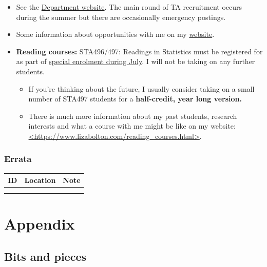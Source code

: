 \documentclass[
]{book}
\begin{document}
\begin{itemize}
\item
  See the \href{https://www.statistics.utoronto.ca/employment-opportunities/cupe-positions-unit-1}{Department website}. The main round of TA recruitment occurs during the summer but there are occasionally emergency postings.
\item
  Some information about opportunities with me on my \href{https://www.lizabolton.com/opportunities.html}{website}.
\item
  \textbf{Reading courses:} STA496/497: Readings in Statistics must be registered for as part of \href{https://utoronto.sharepoint.com/sites/ArtSci-STA/Undergrad/SitePages/Special-Enrolment-Courses--STA490Y1,-STA492H1-and-STA496H1-STA497H1.aspx}{special enrolment during July}. I will not be taking on any further students.

  \begin{itemize}
  \item
    If you're thinking about the future, I usually consider taking on a small number of STA497 students for a \textbf{half-credit, year long version.}
  \item
    There is much more information about my past students, research interests and what a course with me might be like on my website: \href{https://www.lizabolton.com/reading_courses.html}{\textless https://www.lizabolton.com/reading\_courses.html\textgreater{}}.
  \end{itemize}
\end{itemize}

\hypertarget{errata}{%
\section{Errata}\label{errata}}

\begin{longtable}[]{@{}lll@{}}
\toprule
ID & Location & Note \\
\midrule
\endhead
& & \\
& & \\
\bottomrule
\end{longtable}

\hypertarget{part-appendix}{%
\part*{Appendix}\label{part-appendix}}

\hypertarget{bits-and-pieces}{%
\chapter{Bits and pieces}\label{bits-and-pieces}}
\end{document}
